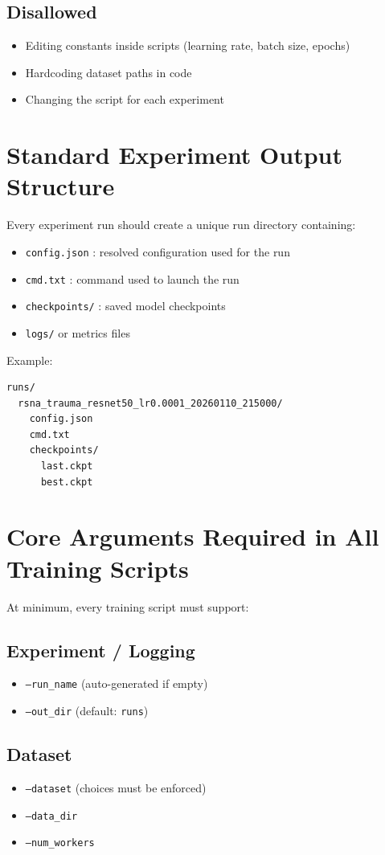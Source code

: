 \documentclass[11pt]{article}
\begin{document}
\subsection{Disallowed}
\begin{itemize}
    \item Editing constants inside scripts (learning rate, batch size, epochs)
    \item Hardcoding dataset paths in code
    \item Changing the script for each experiment
\end{itemize}

\section{Standard Experiment Output Structure}
Every experiment run should create a unique run directory containing:
\begin{itemize}
    \item \texttt{config.json} : resolved configuration used for the run
    \item \texttt{cmd.txt} : command used to launch the run
    \item \texttt{checkpoints/} : saved model checkpoints
    \item \texttt{logs/} or metrics files
\end{itemize}

Example:
\begin{lstlisting}
runs/
  rsna_trauma_resnet50_lr0.0001_20260110_215000/
    config.json
    cmd.txt
    checkpoints/
      last.ckpt
      best.ckpt
\end{lstlisting}

\section{Core Arguments Required in All Training Scripts}
At minimum, every training script must support:

\subsection{Experiment / Logging}
\begin{itemize}
    \item \texttt{--run\_name} (auto-generated if empty)
    \item \texttt{--out\_dir} (default: \texttt{runs})
\end{itemize}

\subsection{Dataset}
\begin{itemize}
    \item \texttt{--dataset} (choices must be enforced)
    \item \texttt{--data\_dir}
    \item \texttt{--num\_workers}
\end{itemize}
\end{document}
